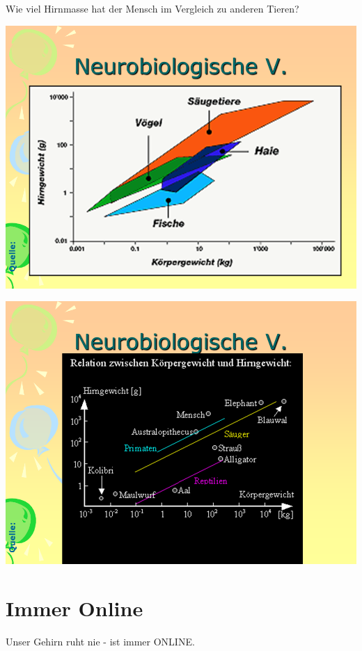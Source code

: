\documentclass[
  letterpaper,
]{scrbook}
\begin{document}
Wie viel Hirnmasse hat der Mensch im Vergleich zu anderen Tieren?

\includegraphics[width=1\textwidth,height=\textheight]{./pictures/neuro/Diapozitiv10.PNG}

\includegraphics[width=1\textwidth,height=\textheight]{./pictures/neuro/Diapozitiv11.PNG}

\hypertarget{immer-online}{%
\section{Immer Online}\label{immer-online}}

Unser Gehirn ruht nie - ist immer ONLINE.
\end{document}
